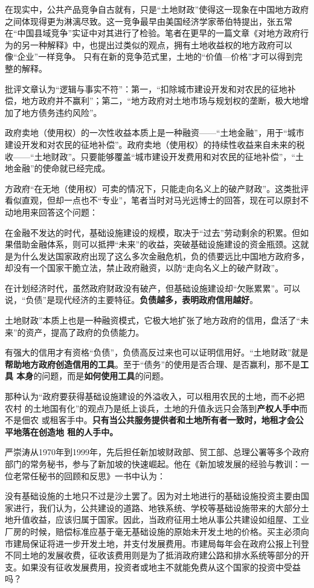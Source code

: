 在现实中，公共产品竞争自古就有，只是“土地财政”使得这一现象在中国地方政府之间体现得更为淋漓尽致。这一竞争最早由美国经济学家蒂伯特提出，张五常在“中国县域竞争”实证中对其进行了检验。笔者在更早的一篇文章《对地方政府行为的另一种解释》中，也提出过类似的观点，拥有土地收益权的地方政府可以像“企业”一样竞争。
只有在新的竞争范式里，土地的“价值—价格”才可以得到完整的解释。

批评文章认为“逻辑与事实不符”：第一，“扣除城市建设开发和对农民的征地补偿，地方政府并不赢利”；第二，“地方政府对土地市场与规划权的垄断，极大地增加了地方债务违约风险”。

政府卖地（使用权）的一次性收益本质上是一种融资——“土地金融”，用于“城市建设开发和对农民的征地补偿”。政府卖地（使用权）的持续性收益来自未来的税收——“土地财政”。只要能够覆盖“城市建设开发费用和对农民的征地补偿”，“土地金融”的使命就已经完成。

方政府“在无地（使用权）可卖的情况下，只能走向名义上的破产财政”。这类批评看似直观，但却一点也不“专业”，笔者当时对马光远博士的回答，现在可以原封不动地用来回答这个问题：

在金融不发达的时代，基础设施建设的规模，取决于“过去”劳动剩余的积累。但如果借助金融体系，则可以抵押“未来”的收益，突破基础设施建设的资金瓶颈。这就是为什么发达国家政府出现了这么多次金融危机，负的债要远比中国地方政府多，却没有一个国家干脆立法，禁止政府融资，以防“走向名义上的破产财政”。

在计划经济时代，虽然政府财政没有破产，但基础设施建设却“欠账累累”。可以说，“负债”是现代经济的主要特征。\textbf{负债越多，表明政府信用越好}。

土地财政”本质上也是一种融资模式，它极大地扩张了地方政府的信用，盘活了“未来”的资产，提高了政府的负债能力。

有强大的信用才有资格“负债”，负债高反过来也可以证明信用好。“土地财政”就是
\textbf{帮助地方政府创造信用的工具}。至于“债务”的使用是否合理、是否赢利，那不是\textbf{工具
本身}的问题，而是\textbf{如何使用工具}的问题。


那种认为“政府要获得基础设施建设的外溢收入，可以租用农民的土地，而不必把农村
的土地国有化”的观点乃是纸上谈兵，土地的升值永远只会落到\textbf{产权人手中}而不是佃农
或租客手中。\textbf{只有当公共服务提供者和土地所有者一致时，地租才会公平地落在创造地
租的人手中。}

严崇涛从1970年到1999年，先后担任新加坡财政部、贸工部、总理公署等多个政府部门的常务秘书，参与了新加坡的快速崛起。他在《新加坡发展的经验与教训：一位老常任秘书的回顾和反思》一书中认为：

没有基础设施的土地只不过是沙土罢了。因为对土地进行的基础设施投资主要由国家进行，我们认为，公共建设的道路、地铁系统、学校等基础设施带来的大部分土地升值收益，应该归属于国家。因此，当政府征用土地从事公共建设如组屋、工业厂房的时候，赔偿标准应基于毫无基础设施的原始未开发土地的价格。买主必须向市建局保证将进一步开发土地，并支付发展费用。市建局每年会在政府公报上刊登不同土地的发展收费，征收该费用则是为了抵消政府建公路和排水系统等部分的开支。如果没有征收发展费用，投资者或地主不就能免费从这个国家的投资中受益吗？

